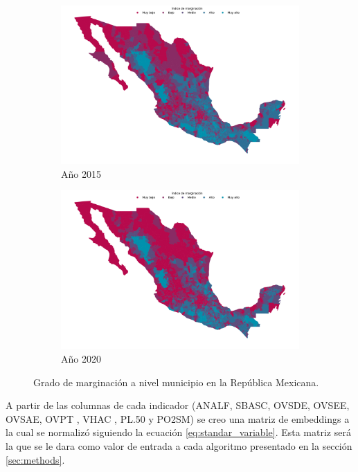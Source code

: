 \begin{figure}[H]
	\centering
	\begin{subfigure}{8.4cm}
		\caption{Año 2015}
		\includegraphics[width=1\linewidth]{Graphics/Data_2015/map.png}
	\end{subfigure}
	\begin{subfigure}{8.4cm}
		\caption{Año 2020}
		\includegraphics[width=1\linewidth]{Graphics/Data_2020/map.png}
	\end{subfigure}
	\caption{Grado de marginación a nivel municipio en la República Mexicana.}
	\label{fig:map_mexico}
\end{figure}

A partir de las columnas de cada indicador (ANALF, SBASC, OVSDE, OVSEE, OVSAE, OVPT , VHAC , PL.50 y PO2SM) se creo una matriz de embeddings a la cual se normalizó siguiendo la ecuación \ref{eq:standar_variable}. Esta matriz será la que se le dara como valor de entrada a cada algoritmo presentado en la sección \ref{sec:methods}.
